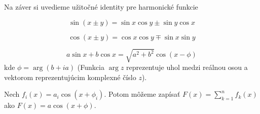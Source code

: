 Na záver si uvedieme užitočné identity pre harmonické funkcie
\begin{lema}
    \begin{equation*}
        \sin(x\pm y) = \sin x \cos y \pm \sin y \cos x
    \end{equation*}
\end{lema}

\begin{lema}
    \begin{equation*}
        \cos(x\pm y) = \cos x \cos y \mp \sin x \sin y
    \end{equation*}
\end{lema}

\begin{lema}
    \begin{equation*}
        a \sin x + b \cos x = \sqrt{a^2 + b^2} \cos (x - \phi)
    \end{equation*}
    kde $\phi = \arg (b + i a)$ (Funkcia $\arg z$ reprezentuje
    uhol medzi reálnou osou a vektorom reprezentujúcim komplexné číslo
    $z$).
    \label{lema:lk_sin_cos}
\end{lema}
\begin{lema}
    Nech $f_i(x) = a_i \cos (x + \phi_i)$.
    Potom môžeme zapísať $F(x) = \sum_{k=1}^n f_k(x)$ ako
    $F(x) = a \cos (x + \phi)$.
    \label{lema:lk_harmonickych_funkcii}
\end{lema}
